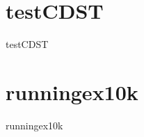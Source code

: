 \section{testCDST}
\label{sec:datasets:testCDST}
\begin{datasetDescription}{testCDST}
\end{datasetDescription}

\section{runningex10k}
\label{sec:datasets:runningex10k}
\begin{datasetDescription}{runningex10k}
\end{datasetDescription}

